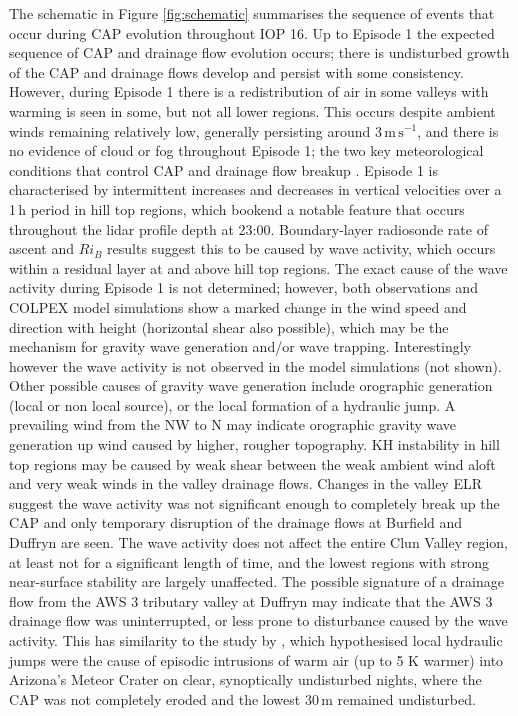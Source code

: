 \documentclass[times]{qjrms4}
\begin{document}
The schematic in Figure \ref{fig:schematic} summarises the sequence of events that occur during CAP evolution throughout IOP 16. Up to Episode 1 the expected sequence of CAP and drainage flow evolution occurs; there is undisturbed growth of the CAP and drainage flows develop and persist with some consistency. However, during Episode 1 there is a redistribution of air in some valleys with warming is seen in some, but not all lower regions. This occurs despite ambient winds remaining relatively low, generally persisting around $3\,\mbox{m}\,\mbox{s}^{-1}$, and there is no evidence of cloud or fog throughout Episode 1; the two key meteorological conditions that control CAP and drainage flow breakup \citep{sheridan2013characteristics}. Episode 1 is characterised by intermittent increases and decreases in vertical velocities over a 1$\,\mbox{h}$ period in hill top regions, which bookend a notable feature that occurs throughout the lidar profile depth at 23:00. Boundary-layer radiosonde rate of ascent and $Ri_B$ results suggest this to be caused by wave activity, which occurs within a residual layer at and above hill top regions. The exact cause of the wave activity during Episode 1 is not determined; however, both observations and COLPEX model simulations \citep{Vosper2013narrow} show a marked change in the wind speed and direction with height (horizontal shear also possible), which may be the mechanism for gravity wave generation and/or wave trapping. Interestingly however the wave activity is not observed in the model simulations (not shown). Other possible causes of gravity wave generation include orographic generation (local or non local source), or the local formation of a hydraulic jump. A prevailing wind from the NW to N may indicate orographic gravity wave generation up wind caused by higher, rougher topography. KH instability in hill top regions may be caused by weak shear between the weak ambient wind aloft and very weak winds in the valley drainage flows. Changes in the valley ELR suggest the wave activity was not significant enough to completely break up the CAP and only temporary disruption of the drainage flows at Burfield and Duffryn are seen. The wave activity does not affect the entire Clun Valley region, at least not for a significant length of time, and the lowest regions with strong near-surface stability are largely unaffected. The possible signature of a drainage flow from the AWS 3 tributary valley at Duffryn may indicate that the AWS 3 drainage flow was uninterrupted, or less prone to disturbance caused by the wave activity. This has similarity to the study by \citet{adler2012warm}, which hypothesised local hydraulic jumps were the cause of episodic intrusions of warm air (up to 5 K warmer) into Arizona's Meteor Crater on clear, synoptically undisturbed nights, where the CAP was not completely eroded and the lowest 30$\,\mbox{m}$ remained undisturbed.
\end{document}
